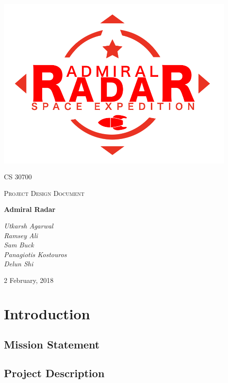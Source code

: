 \documentclass[12pt]{article}
\begin{document}
\begin{titlepage}
	\centering
	\includegraphics[width=0.9\textwidth]{logo}\par\vspace{1cm}
	{\scshape\LARGE CS 30700 \par}
	{\scshape\Large Project Design Document\par}
	\vspace{1.5cm}
	{\Huge\bfseries Admiral Radar\par}
	\vspace{1.5cm}
	{\large\itshape Utkarsh Agarwal\\ Ramsey Ali \\ Sam Buck \\ Panagiotis Kostouros \\ Delun Shi \par}

	\vfill
	{\large 2 February, 2018 \par}
\end{titlepage}

\doublespacing
\tableofcontents
\singlespacing

\pagebreak

\section{Introduction}

\subsection{Mission Statement}


\subsection{Project Description}

\end{document}
